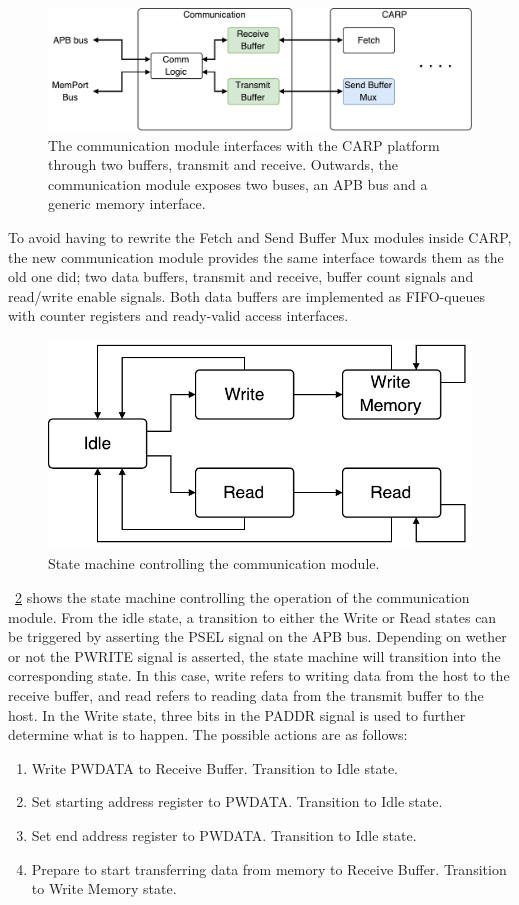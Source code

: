 \begin{figure}[ht]
  \centering
  \includegraphics[width=0.8\linewidth]{fig/comm-io}
  \caption{
    The communication module interfaces with the CARP platform through two
    buffers, transmit and receive. Outwards, the communication module exposes two
    buses, an APB bus and a generic memory interface.
  }
  \label{fig:comm-io}
\end{figure}

To avoid having to rewrite the Fetch and Send Buffer Mux modules inside CARP,
the new communication module provides the same interface towards them as the old
one did; two data buffers, transmit and receive, buffer count signals and
read/write enable signals. Both data buffers are implemented as FIFO-queues with
counter registers and ready-valid access interfaces.

\begin{figure}[ht]
  \centering
  \includegraphics[width=0.5\linewidth]{fig/comm-fsm}
  \caption{State machine controlling the communication module.}
  \label{fig:comm-fsm}
\end{figure}

\figurename~\ref{fig:comm-fsm} shows the state machine controlling the operation
of the communication module. From the idle state, a transition to either the
Write or Read states can be triggered by asserting the PSEL signal on the APB
bus. Depending on wether or not the PWRITE signal is asserted, the state machine
will transition into the corresponding state. In this case, write refers to
writing data from the host to the receive buffer, and read refers to reading
data from the transmit buffer to the host. In the Write state, three bits in the
PADDR signal is used to further determine what is to happen. The possible
actions are as follows:

\begin{enumerate}
\item Write PWDATA to Receive Buffer. Transition to Idle state.
\item Set starting address register to PWDATA. Transition to Idle state.
\item Set end address register to PWDATA. Transition to Idle state.
\item Prepare to start transferring data from memory to Receive Buffer.
  Transition to Write Memory state.
\end{enumerate}

